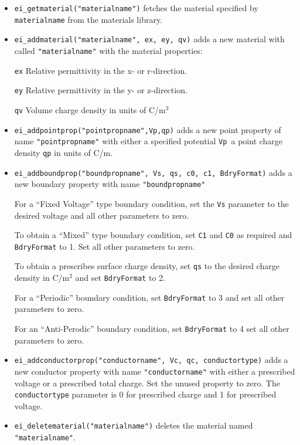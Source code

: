 \begin{itemize}
\item \texttt{ei\_getmaterial("materialname")} fetches the material specified by \texttt{materialname}
from the materials library.

\item \texttt{ei\_addmaterial("materialname", ex, ey, qv)} adds a new material with
called \texttt{"materialname"} with the material properties:

\texttt{ex} Relative permittivity in the x- or r-direction.

\texttt{ey} Relative permittivity in the y- or z-direction.

\texttt{qv} Volume charge density in units of C/m$^{3}$

\item \texttt{ei\_addpointprop("pointpropname",Vp,qp)} adds a new point property of
name \texttt{"pointpropname"} with either a specified potential
\texttt{Vp }a point charge density \texttt{qp} in units of C/m.

\item \texttt{ei\_addboundprop("boundpropname", Vs, qs, c0, c1, BdryFormat)} adds a
new boundary property with name \texttt{"boundpropname"}

For a ``Fixed Voltage'' type boundary condition, set the
\texttt{Vs} parameter to the desired voltage and all other
parameters to zero.

To obtain a ``Mixed'' type boundary condition, set \texttt{C1} and
\texttt{C0} as required and \texttt{BdryFormat} to 1. Set all other
parameters to zero.

To obtain a prescribes surface charge density, set \texttt{qs} to
the desired charge density in C/m$^{2}$ and set \texttt{BdryFormat}
to 2.

For a ``Periodic'' boundary condition, set \texttt{BdryFormat} to 3
and set all other parameters to zero.

For an ``Anti-Perodic'' boundary condition, set \texttt{BdryFormat}
to 4 set all other parameters to zero.

\item \texttt{ei\_addconductorprop("conductorname", Vc, qc, conductortype)} adds a new
conductor property with name \texttt{"conductorname"} with either a
prescribed voltage or a prescribed total charge. Set the unused
property to zero. The \texttt{conductortype} parameter is 0 for
prescribed charge and 1 for prescribed voltage.

\item \texttt{ei\_deletematerial("materialname")} deletes the material named
\texttt{"materialname"}.


\end{itemize}
